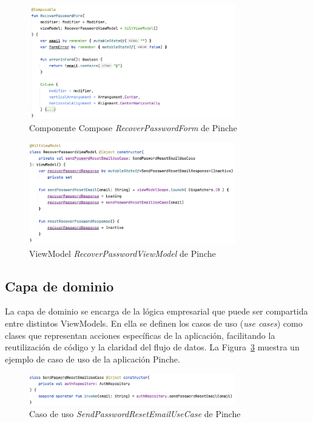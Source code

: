 \begin{figure}[H]
\centering
\includegraphics[width=0.8\textwidth]{./img/description/recoverPasswordView.png}
\caption{Componente Compose \textit{RecoverPasswordForm} de Pinche}
\label{fig:recoverPasswordView}
\end{figure}

\begin{figure}[H]
\centering
\includegraphics[width=0.8\textwidth]{./img/description/recoverPasswordViewModel.png}
\caption{ViewModel \textit{RecoverPasswordViewModel} de Pinche}
\label{fig:recoverPasswordViewModel}
\end{figure}

\subsection{Capa de dominio}

La capa de dominio se encarga de la lógica empresarial que puede ser compartida entre distintos ViewModels. En ella se definen los casos de uso (\textit{use cases}) como clases que representan acciones específicas de la aplicación, facilitando la reutilización de código y la claridad del flujo de datos. La Figura~\ref{fig:recoverUseCase} muestra un ejemplo de caso de uso de la aplicación Pinche.

\begin{figure}[H]
\centering
\includegraphics[width=0.8\textwidth]{./img/description/recoverUseCase.png}
\caption{Caso de uso \textit{SendPasswordResetEmailUseCase} de Pinche}
\label{fig:recoverUseCase}
\end{figure}

